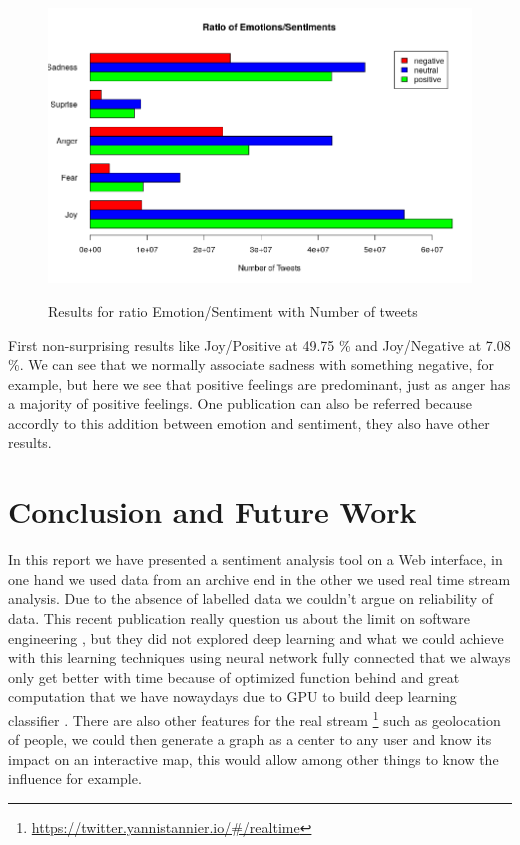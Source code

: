 \documentclass{acmtog} %
\begin{document}
\begin{figure}[h!]
{\includegraphics[width=\linewidth]{final_plot_contradiction_analysis.png}}
\caption{Results for ratio Emotion/Sentiment with Number of tweets}
  \label{fig:contradiction_barplot}
\end{figure}

First non-surprising results like Joy/Positive at 49.75 \% and Joy/Negative at 7.08 \%.
We can see that we normally associate sadness with something negative, for example, but here we see that positive feelings are predominant, just as anger has a majority of positive feelings. One publication can also be referred \cite{Alm05}  because accordly to this addition between emotion and sentiment, they also have other results.


\section{Conclusion and Future Work}
\label{sec:conclusion}

In this report we have presented a sentiment analysis tool on a Web interface, in one hand we used data from an archive end in the other we used real time stream analysis. Due to the absence of labelled data we couldn't argue on reliability of data.  This recent publication really question us about the limit on software engineering \cite{Lin18}, but they did not explored deep learning \cite{Meisheri17} and what we could achieve with this learning techniques using neural network fully connected that we always only get better with time because of optimized function behind and great computation that we have nowaydays due to GPU to build deep learning classifier \cite{Araque17}. 
There are also other features for the real stream \footnote{\url{https://twitter.yannistannier.io/#/realtime}} such as geolocation of people, we could then generate a graph as a center to any user and know its impact on an interactive map, this would allow among other things to know the influence for example.
\end{document}
